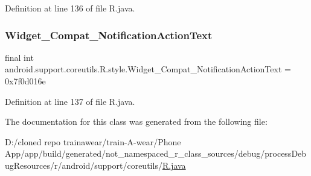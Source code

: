 Definition at line 136 of file R.\+java.

\mbox{\label{classandroid_1_1support_1_1coreutils_1_1_r_1_1style_afecf35538e16fa5d87a95f377bcd856d}} 
\subsubsection{\texorpdfstring{Widget\_Compat\_NotificationActionText}{Widget\_Compat\_NotificationActionText}}
{\footnotesize\ttfamily final int android.\+support.\+coreutils.\+R.\+style.\+Widget\+\_\+\+Compat\+\_\+\+Notification\+Action\+Text = 0x7f0d016e\hspace{0.3cm}{\ttfamily [static]}}



Definition at line 137 of file R.\+java.



The documentation for this class was generated from the following file\+:\begin{DoxyCompactItemize}
\item 
D\+:/cloned repo trainawear/train-\/\+A-\/wear/\+Phone App/app/build/generated/not\+\_\+namespaced\+\_\+r\+\_\+class\+\_\+sources/debug/process\+Debug\+Resources/r/android/support/coreutils/\mbox{\hyperlink{process_debug_resources_2r_2android_2support_2coreutils_2_r_8java}{R.\+java}}\end{DoxyCompactItemize}
